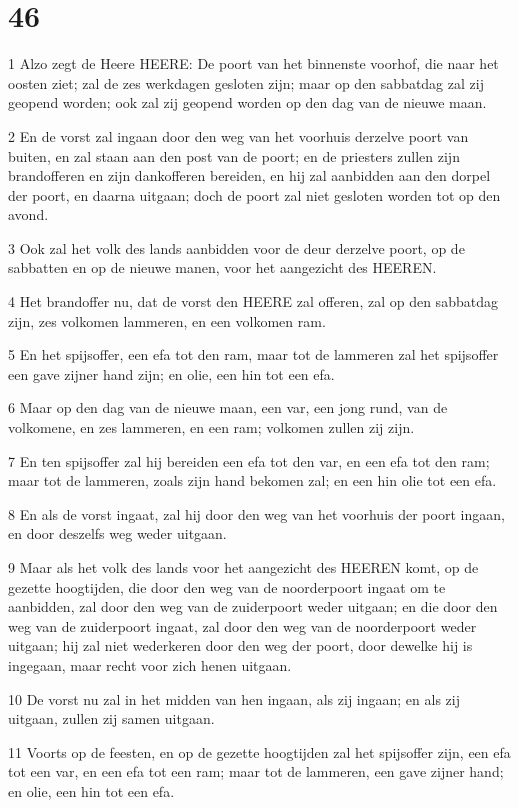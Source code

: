 \chapter{46}

\par 1 Alzo zegt de Heere HEERE: De poort van het binnenste voorhof, die naar het oosten ziet; zal de zes werkdagen gesloten zijn; maar op den sabbatdag zal zij geopend worden; ook zal zij geopend worden op den dag van de nieuwe maan.
\par 2 En de vorst zal ingaan door den weg van het voorhuis derzelve poort van buiten, en zal staan aan den post van de poort; en de priesters zullen zijn brandofferen en zijn dankofferen bereiden, en hij zal aanbidden aan den dorpel der poort, en daarna uitgaan; doch de poort zal niet gesloten worden tot op den avond.
\par 3 Ook zal het volk des lands aanbidden voor de deur derzelve poort, op de sabbatten en op de nieuwe manen, voor het aangezicht des HEEREN.
\par 4 Het brandoffer nu, dat de vorst den HEERE zal offeren, zal op den sabbatdag zijn, zes volkomen lammeren, en een volkomen ram.
\par 5 En het spijsoffer, een efa tot den ram, maar tot de lammeren zal het spijsoffer een gave zijner hand zijn; en olie, een hin tot een efa.
\par 6 Maar op den dag van de nieuwe maan, een var, een jong rund, van de volkomene, en zes lammeren, en een ram; volkomen zullen zij zijn.
\par 7 En ten spijsoffer zal hij bereiden een efa tot den var, en een efa tot den ram; maar tot de lammeren, zoals zijn hand bekomen zal; en een hin olie tot een efa.
\par 8 En als de vorst ingaat, zal hij door den weg van het voorhuis der poort ingaan, en door deszelfs weg weder uitgaan.
\par 9 Maar als het volk des lands voor het aangezicht des HEEREN komt, op de gezette hoogtijden, die door den weg van de noorderpoort ingaat om te aanbidden, zal door den weg van de zuiderpoort weder uitgaan; en die door den weg van de zuiderpoort ingaat, zal door den weg van de noorderpoort weder uitgaan; hij zal niet wederkeren door den weg der poort, door dewelke hij is ingegaan, maar recht voor zich henen uitgaan.
\par 10 De vorst nu zal in het midden van hen ingaan, als zij ingaan; en als zij uitgaan, zullen zij samen uitgaan.
\par 11 Voorts op de feesten, en op de gezette hoogtijden zal het spijsoffer zijn, een efa tot een var, en een efa tot een ram; maar tot de lammeren, een gave zijner hand; en olie, een hin tot een efa.
